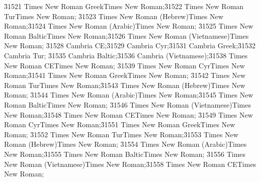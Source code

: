 {\fdbmajor\f31521\fbidi \froman{} Times New Roman Greek{\*\falt Times New Roman};}{\fdbmajor\f31522\fbidi \froman{} Times New Roman Tur{\*\falt Times New Roman};}
{\fdbmajor\f31523\fbidi \froman{} Times New Roman (Hebrew){\*\falt Times New Roman};}{\fdbmajor\f31524\fbidi \froman{} Times New Roman (Arabic){\*\falt Times New Roman};}
{\fdbmajor\f31525\fbidi \froman{} Times New Roman Baltic{\*\falt Times New Roman};}{\fdbmajor\f31526\fbidi \froman{} Times New Roman (Vietnamese){\*\falt Times New Roman};}
{\fhimajor\f31528\fbidi \froman{} Cambria CE;}{\fhimajor\f31529\fbidi \froman{} Cambria Cyr;}{\fhimajor\f31531\fbidi \froman{} Cambria Greek;}{\fhimajor\f31532\fbidi \froman{} Cambria Tur;}
{\fhimajor\f31535\fbidi \froman{} Cambria Baltic;}{\fhimajor\f31536\fbidi \froman{} Cambria (Vietnamese);}{\fbimajor\f31538\fbidi \froman{} Times New Roman CE{\*\falt Times New Roman};}
{\fbimajor\f31539\fbidi \froman{} Times New Roman Cyr{\*\falt Times New Roman};}{\fbimajor\f31541\fbidi \froman{} Times New Roman Greek{\*\falt Times New Roman};}
{\fbimajor\f31542\fbidi \froman{} Times New Roman Tur{\*\falt Times New Roman};}{\fbimajor\f31543\fbidi \froman{} Times New Roman (Hebrew){\*\falt Times New Roman};}
{\fbimajor\f31544\fbidi \froman{} Times New Roman (Arabic){\*\falt Times New Roman};}{\fbimajor\f31545\fbidi \froman{} Times New Roman Baltic{\*\falt Times New Roman};}
{\fbimajor\f31546\fbidi \froman{} Times New Roman (Vietnamese){\*\falt Times New Roman};}{\flominor\f31548\fbidi \froman{} Times New Roman CE{\*\falt Times New Roman};}
{\flominor\f31549\fbidi \froman{} Times New Roman Cyr{\*\falt Times New Roman};}{\flominor\f31551\fbidi \froman{} Times New Roman Greek{\*\falt Times New Roman};}
{\flominor\f31552\fbidi \froman{} Times New Roman Tur{\*\falt Times New Roman};}{\flominor\f31553\fbidi \froman{} Times New Roman (Hebrew){\*\falt Times New Roman};}
{\flominor\f31554\fbidi \froman{} Times New Roman (Arabic){\*\falt Times New Roman};}{\flominor\f31555\fbidi \froman{} Times New Roman Baltic{\*\falt Times New Roman};}
{\flominor\f31556\fbidi \froman{} Times New Roman (Vietnamese){\*\falt Times New Roman};}{\fdbminor\f31558\fbidi \froman{} Times New Roman CE{\*\falt Times New Roman};}
